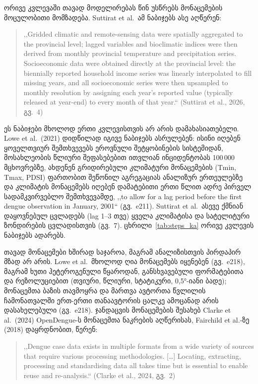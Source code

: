 \documentclass[11pt,a4paper]{article}
\newcommand{\enquote}[1]{,,#1``}
\begin{document}
ორივე კვლევაში თავად მოდელირებას წინ უსწრებს მონაცემების მოცულობითი
მომზადება. Suttirat et al.\ ამ ნაბიჯებს ასე აღწერენ:

\begin{quote}
\enquote{Gridded climatic and remote-sensing data were spatially aggregated to
the provincial level; lagged variables and bioclimatic indices were then derived
from monthly provincial temperature and precipitation series. Socioeconomic data
were obtained directly at the provincial level: the biennially reported household
income series was linearly interpolated to fill missing years, and all
socioeconomic series were then upsampled to monthly resolution by assigning each
year's reported value (typically released at year-end) to every month of that
year.} (Suttirat et al., 2026, გვ.~4)
\end{quote}

ეს ნაბიჯები მხოლოდ ერთი კვლევისთვის არ არის დამახასიათებელი. Lowe et al.\ (2021)
დიდწილად იგივე ნაბიჯებს ასრულებენ:
ისინი იღებენ ყოველთვიურ შემთხვევებს ეროვნული შეტყობინების სისტემიდან,
მოსახლეობის წლიური შეფასებებით ითვლიან ინციდენტობას 100\,000 მცხოვრებზე,
ახდენენ გრიდირებული კლიმატური მონაცემების (Tmin, Tmax, PDSI) ფართობით შეწონილ
აგრეგაციას ანალიზურ ერთეულებზე და კლიმატის მონაცემებს იღებენ დამატებითი
ერთი წლით ადრე პირველ სადამკვირვებლო შემთხვევამდე, \enquote{to allow for a
lag period before the first dengue observation in January, 2001} (გვ.~e211).
Suttirat et al.\ ასევე ქმნიან დაყოვნებულ ცვლადებს (lag 1--3 თვე) ყველა
კლიმატისა და სატელიტური ზონდირების ცვლადისთვის (გვ.~7).
ცხრილი~\ref{tab:steps_ka} ორივე კვლევის ნაბიჯებს ადარებს.

თავად მონაცემები ხშირად საჯაროა, მაგრამ ანალიზისთვის პირდაპირ მზად არ არის.
Lowe et al.\ მხოლოდ ღია მონაცემებს იყენებენ (გვ.~e218), მაგრამ ხუთი
ჰეტეროგენული წყაროდან, განსხვავებული ფორმატებითა და რეზოლუციებით (თვიური,
წლიური, სტატიკური, 0,5°-იანი ბადე); მონაცემთა ბაზის თავმოყრა და მართვა ავტორთა
წვლილის ჩამონათვალში ერთ-ერთი თანაავტორის ცალკე ამოცანად არის დასახელებული
(გვ.~e218). ჯანდაცვის მონაცემების შესახებ Clarke et al.\ (2024)
OpenDengue-ს მონაცემთა ნაკრების აღწერისას, Fairchild et al.-ზე (2018) დაყრდნობით, წერენ:

\begin{quote}
\enquote{Dengue case data exists in multiple formats from a wide variety of
sources that require various processing methodologies. [\ldots] Locating,
extracting, processing and standardising data all takes time but is essential to
enable reuse and re-analysis.} (Clarke et al., 2024, გვ.~2)
\end{quote}
\end{document}
